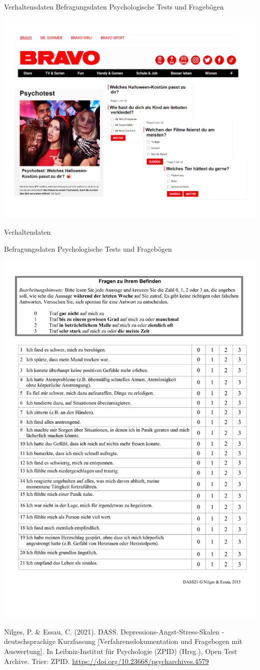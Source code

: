 \documentclass[
  8pt,
  ignorenonframetext,
]{beamer}
\begin{document}
\begin{frame}{Verhaltensdaten}
\protect\hypertarget{verhaltensdaten-3}{}
Befragungsdaten \textbar{} Psychologische Tests und Fragebögen
\vspace{-2mm}

\begin{center}\includegraphics[width=0.75\linewidth]{3_Abbildungen/pfm_3_fragebogen_1} \end{center}
\end{frame}

\begin{frame}{Verhaltendaten}
\protect\hypertarget{verhaltendaten}{}
\vspace{1mm}

Befragungsdaten \textbar{} Psychologische Tests und Fragebögen
\vspace{-3mm}

\begin{center}\includegraphics[width=0.4\linewidth]{3_Abbildungen/pfm_3_fragebogen_2} \end{center}
\vspace{-3mm}
\flushright
\tiny

Nilges, P. \& Essau, C. (2021). DASS. Depressions-Angst-Stress-Skalen -
deutschsprachige Kurzfassung {[}Verfahrensdokumentation und Fragebogen
mit Auswertung{]}. In Leibniz-Institut für Psychologie (ZPID) (Hrsg.),
Open Test Archive. Trier: ZPID.
\url{https://doi.org/10.23668/psycharchives.4579}
\end{frame}
\end{document}
